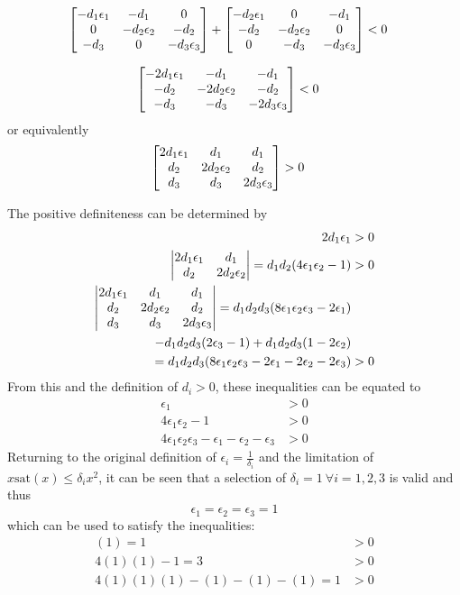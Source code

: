 \documentclass[letter]{article}
\numberwithin{equation}{section}
\newcommand{\sat}{\text{sat}}
\begin{document}
\begin{align}
	\mqty[-d_1\epsilon_1 & -d_1 &0\\
	0 &-d_2\epsilon_2 &-d_2\\
	-d_3	&0	&-d_3\epsilon_3]+
	\mqty[-d_2\epsilon_1 & 0 &-d_1\\
	-d_2 &-d_2\epsilon_2 &0\\
	0	&-d_3	&-d_3\epsilon_3]
	&< 0
\end{align}

\begin{align}
	\mqty[-2 d_1\epsilon_1 & -d_1 &-d_1\\
	-d_2 &-2 d_2\epsilon_2 &-d_2\\
	-d_3	&-d_3	&-2 d_3\epsilon_3]
	&< 0
\end{align}
or equivalently
\begin{align}
	\mqty[2 d_1\epsilon_1 & d_1 &d_1\\
	d_2 &2 d_2\epsilon_2 &d_2\\
	d_3	&d_3	&2 d_3\epsilon_3]
	&> 0
\end{align}

\newpage
The positive definiteness can be determined by
\begin{align}
	2 d_1 \epsilon_1 &>0\\
	\mqty|2 d_1\epsilon_1 & d_1\\
	d_2 &2 d_2\epsilon_2| = d_1 d_2 (4 \epsilon_1 \epsilon_2 - 1) &> 0\\
	\mqty|2 d_1\epsilon_1 & d_1 &d_1\\
	d_2 &2 d_2\epsilon_2 &d_2\\
	d_3	&d_3	&2 d_3\epsilon_3|
	= d_1 d_2 d_3  (8 \epsilon_1 \epsilon_2 \epsilon_3 - 2 \epsilon_1)\nonumber\\
	- d_1 d_2 d_3(2 \epsilon_3 - 1)
	+ d_1 d_2 d_3 (1 - 2\epsilon_2)\nonumber\\
	= d_1 d_2 d_3 (8 \epsilon_1 \epsilon_2 \epsilon_3 
	- 2 \epsilon_1
	- 2 \epsilon_2
	- 2 \epsilon_3)
	&>0
\end{align}
From this and the definition of $d_i > 0$, these inequalities can be equated to
\begin{align}
	\epsilon_1&>0\\
	4 \epsilon_1 \epsilon_2 -1 &>0\\
	4 \epsilon_1 \epsilon_2 \epsilon_3 - \epsilon_1 - \epsilon_2 - \epsilon_3 &> 0	
\end{align}
Returning to the original definition of $\epsilon_i = \frac{1}{\delta_i}$ and the limitation of $x \sat(x) \leq \delta_i x^2$,
it can be seen that a selection of $\delta_i = 1 \ \forall i=1,2,3$ is valid and thus $$\epsilon_1 = \epsilon_2 = \epsilon_3 = 1$$
which can be used to satisfy the inequalities:
\begin{align}
	(1) = 1&>0\\
	4 (1) (1) -1 = 3 &>0\\
	4 (1) (1) (1) - (1) - (1) - (1) = 1 &> 0	
\end{align}
\end{document}
